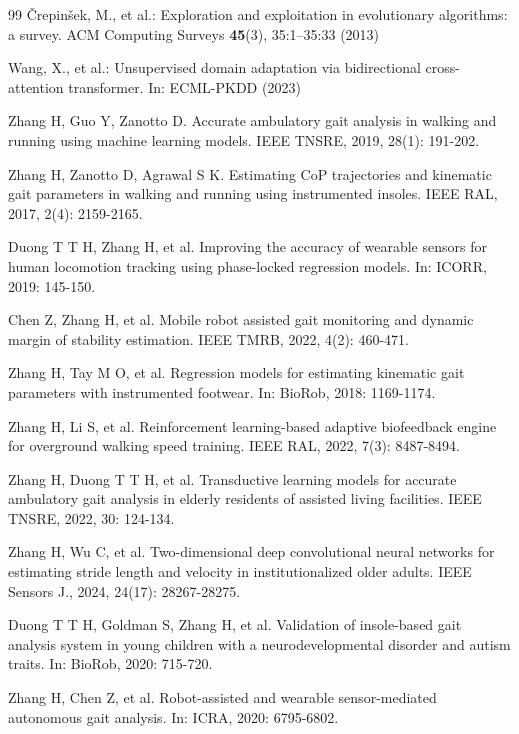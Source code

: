 \documentclass[conference]{IEEEtran}
\begin{document}
\begin{thebibliography}{99}
Črepinšek, M., et al.: Exploration and exploitation in evolutionary algorithms: a survey. ACM Computing Surveys \textbf{45}(3), 35:1--35:33 (2013)

Wang, X., et al.: Unsupervised domain adaptation via bidirectional cross-attention transformer. In: ECML-PKDD (2023)

Zhang H, Guo Y, Zanotto D. Accurate ambulatory gait analysis in walking and running using machine learning models. IEEE TNSRE, 2019, 28(1): 191-202.

Zhang H, Zanotto D, Agrawal S K. Estimating CoP trajectories and kinematic gait parameters in walking and running using instrumented insoles. IEEE RAL, 2017, 2(4): 2159-2165.

Duong T T H, Zhang H, et al. Improving the accuracy of wearable sensors for human locomotion tracking using phase-locked regression models. In: ICORR, 2019: 145-150.

Chen Z, Zhang H, et al. Mobile robot assisted gait monitoring and dynamic margin of stability estimation. IEEE TMRB, 2022, 4(2): 460-471.

Zhang H, Tay M O, et al. Regression models for estimating kinematic gait parameters with instrumented footwear. In: BioRob, 2018: 1169-1174.

Zhang H, Li S, et al. Reinforcement learning-based adaptive biofeedback engine for overground walking speed training. IEEE RAL, 2022, 7(3): 8487-8494.

Zhang H, Duong T T H, et al. Transductive learning models for accurate ambulatory gait analysis in elderly residents of assisted living facilities. IEEE TNSRE, 2022, 30: 124-134.

Zhang H, Wu C, et al. Two-dimensional deep convolutional neural networks for estimating stride length and velocity in institutionalized older adults. IEEE Sensors J., 2024, 24(17): 28267-28275.

Duong T T H, Goldman S, Zhang H, et al. Validation of insole-based gait analysis system in young children with a neurodevelopmental disorder and autism traits. In: BioRob, 2020: 715-720.

Zhang H, Chen Z, et al. Robot-assisted and wearable sensor-mediated autonomous gait analysis. In: ICRA, 2020: 6795-6802.

\end{thebibliography}
\end{document}
